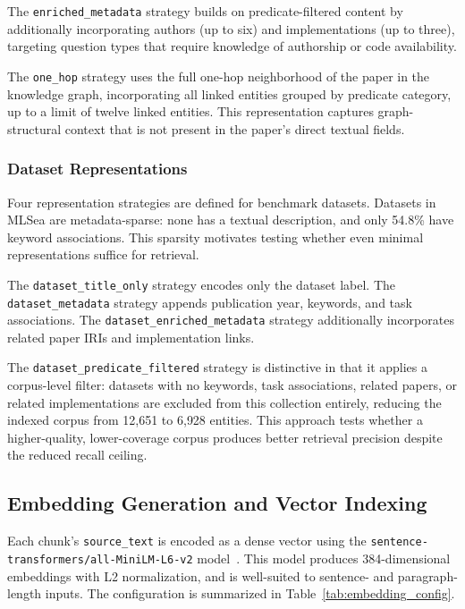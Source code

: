 The \texttt{enriched\_metadata} strategy builds on predicate-filtered content
by additionally incorporating authors (up to six) and implementations (up to
three), targeting question types that require knowledge of authorship or code
availability.

The \texttt{one\_hop} strategy uses the full one-hop neighborhood of the paper
in the knowledge graph, incorporating all linked entities grouped by predicate
category, up to a limit of twelve linked entities.
This representation captures graph-structural context that is not present in
the paper's direct textual fields.

\subsubsection{Dataset Representations}
\label{subsubsec:dataset_representations}

Four representation strategies are defined for benchmark datasets.
Datasets in MLSea are metadata-sparse: none has a textual description, and
only 54.8\% have keyword associations.
This sparsity motivates testing whether even minimal representations suffice
for retrieval.

The \texttt{dataset\_title\_only} strategy encodes only the dataset label.
The \texttt{dataset\_metadata} strategy appends publication year, keywords,
and task associations.
The \texttt{dataset\_enriched\_metadata} strategy additionally incorporates
related paper IRIs and implementation links.

The \texttt{dataset\_predicate\_filtered} strategy is distinctive in that it
applies a corpus-level filter: datasets with no keywords, task associations,
related papers, or related implementations are excluded from this collection
entirely, reducing the indexed corpus from 12{,}651 to 6{,}928 entities.
This approach tests whether a higher-quality, lower-coverage corpus produces
better retrieval precision despite the reduced recall ceiling.
 
\subsection{Embedding Generation and Vector Indexing}
\label{subsec:embedding}

Each chunk's \texttt{source\_text} is encoded as a dense vector using the
\texttt{sentence-transformers/all-MiniLM-L6-v2}
model~.
This model produces 384-dimensional embeddings with L2 normalization, and is
well-suited to sentence- and paragraph-length inputs.
The configuration is summarized in Table~\ref{tab:embedding_config}.


